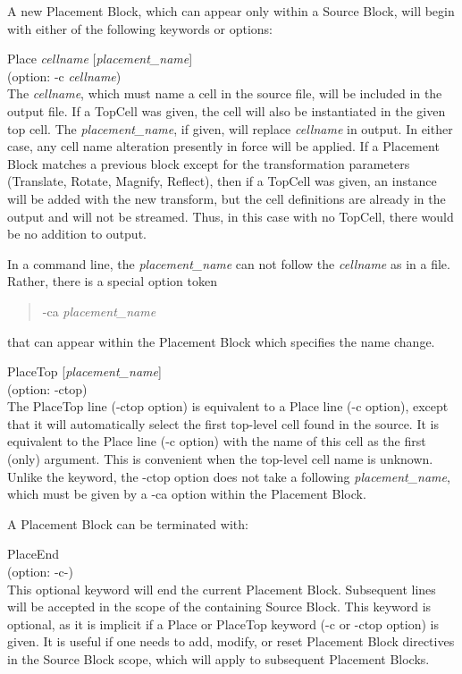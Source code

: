 A new Placement Block, which can appear only within a Source Block,
will begin with either of the following keywords or options:

\begin{description}
\item{\vt Place} {\it cellname} [{\it placement\_name\/}]\\
(option: {\vt -c} {\it cellname})\\
The {\it cellname}, which must name a cell in the source file, will be
included in the output file.  If a {\vt TopCell} was given, the cell
will also be instantiated in the given top cell.  The {\it
placement\_name}, if given, will replace {\it cellname} in output.  In
either case, any cell name alteration presently in force will be
applied.  If a Placement Block matches a previous block except for the
transformation parameters ({\vt Translate}, {\vt Rotate}, {\vt
Magnify}, {\vt Reflect}), then if a {\vt TopCell} was given, an
instance will be added with the new transform, but the cell
definitions are already in the output and will not be streamed.  Thus,
in this case with no {\vt TopCell}, there would be no addition to
output.

In a command line, the {\it placement\_name} can not follow the {\it
cellname} as in a file.  Rather, there is a special option token
\begin{quote}
{\vt -ca} {\it placement\_name}
\end{quote}
that can appear within the Placement Block which specifies the name
change.

\item{\vt PlaceTop} [{\it placement\_name\/}]\\
(option: {\vt -ctop})\\
The {\vt PlaceTop} line ({\vt -ctop} option) is equivalent to a {\vt
Place} line ({\vt -c} option), except that it will automatically
select the first top-level cell found in the source.  It is equivalent
to the {\vt Place} line ({\vt -c} option) with the name of this cell
as the first (only) argument.  This is convenient when the top-level
cell name is unknown.  Unlike the keyword, the {\vt -ctop} option does
not take a following {\it placement\_name\/}, which must be given by a
{\vt -ca} option within the Placement Block.

\end{description}

A Placement Block can be terminated with:

\begin{description}
\item{\vt PlaceEnd}\\
(option: {\vt -c-})\\
This optional keyword will end the current Placement Block. 
Subsequent lines will be accepted in the scope of the containing
Source Block.  This keyword is optional, as it is implicit if a {\vt
Place} or {\vt PlaceTop} keyword ({\vt -c} or {\vt -ctop} option) is
given.  It is useful if one needs to add, modify, or reset Placement
Block directives in the Source Block scope, which will apply to
subsequent Placement Blocks.
\end{description}

